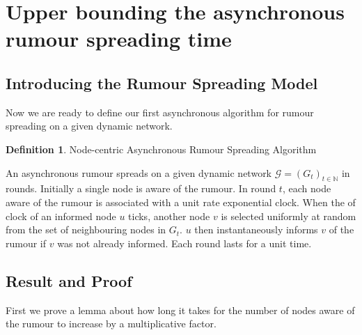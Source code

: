 \documentclass[a4paper,11pt]{article}
\theoremstyle{definition}
\newtheorem{definition}[theorem]{Definition}
\begin{document}
\section{Upper bounding the asynchronous rumour spreading time}
\label{AsyncUpperBoundSection}

\subsection{Introducing the Rumour Spreading Model}
Now we are ready to define our first asynchronous algorithm for rumour spreading on a given dynamic network.

\begin{definition}
	Node-centric Asynchronous Rumour Spreading Algorithm 
\end{definition}
\label{NodeCentricAsyncAlgorithm}

\noindent
An asynchronous rumour spreads on a given dynamic network $\mathcal{G} = (G_t)_{t\in \mathbb{N}}$ in rounds. Initially a single node is aware of the rumour. In round $t$, each node aware of the rumour is associated with a unit rate exponential clock. When the of clock of an informed node $u$ ticks, another node $v$ is selected uniformly at random from the set of neighbouring nodes in $G_t$. $u$ then instantaneously informs $v$ of the rumour if $v$ was not already informed. Each round lasts for a unit time. %





\subsection{Result and Proof}

First we prove a lemma about how long it takes for the number of nodes aware of the rumour to increase by a multiplicative factor. 
\end{document}
